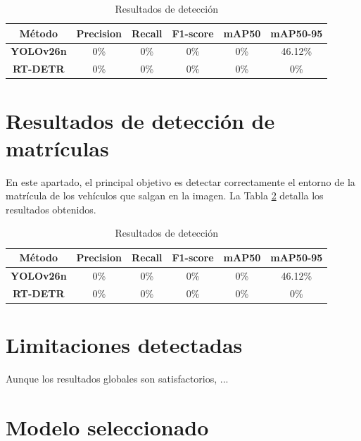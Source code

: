 \documentclass[12pt,a4paper,onecolumn,oneside]{report}
\begin{document}
\begin{table}[ht]
    \centering
    \caption{Resultados de detección}
    \begin{tabular}{|c|c|c|c|c|c|}
        \hline
        \textbf{Método} & \textbf{Precision} & \textbf{Recall} & \textbf{F1-score} & \textbf{mAP50} & \textbf{mAP50-95}\\
        \hline
        \textbf{YOLOv26n} & 0\% & 0\% & 0\% & 0\% & 46.12\%\\
        \hline
        \textbf{RT-DETR} & 0\% & 0\% & 0\% & 0\% & 0\%\\
        \hline
    \end{tabular}
    \label{Res-Deteccion-V}
\end{table}


\section{Resultados de detección de matrículas} %

En este apartado, el principal objetivo es detectar correctamente el entorno de la matrícula de los vehículos que salgan en la imagen. La Tabla \ref{Res-Deteccion-LP} detalla los resultados obtenidos.

\begin{table}[ht]
    \centering
    \caption{Resultados de detección}
    \begin{tabular}{|c|c|c|c|c|c|}
        \hline
        \textbf{Método} & \textbf{Precision} & \textbf{Recall} & \textbf{F1-score} & \textbf{mAP50} & \textbf{mAP50-95}\\
        \hline
        \textbf{YOLOv26n} & 0\% & 0\% & 0\% & 0\% & 46.12\%\\
        \hline
        \textbf{RT-DETR} & 0\% & 0\% & 0\% & 0\% & 0\%\\
        \hline
    \end{tabular}
    \label{Res-Deteccion-LP}
\end{table}


\section{Limitaciones detectadas} %

Aunque los resultados globales son satisfactorios, ... 


\section{Modelo seleccionado} %
\end{document}
